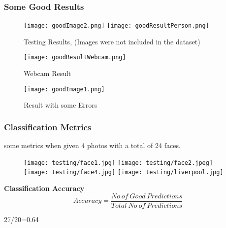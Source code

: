         \subsubsection{Some Good Results}

        \begin{figure}[H]
            \centering
            \texttt{[image: goodImage2.png]}
            \texttt{[image: goodResultPerson.png]}
            \caption{Testing Results, (Images were not included in the dataset)}
            \label{one}
        \end{figure}

        \begin{figure}[H]
            \centering
            \texttt{[image: goodResultWebcam.png]}
            \caption{Webcam Result}
            \label{two}
        \end{figure}

        \begin{figure}[H]
            \centering
            \texttt{[image: goodImage1.png]}
            \caption{Result with some Errors}
            \label{three}
        \end{figure}

        \pagebreak
        \subsubsection{Classification Metrics}
        some metrics when given 4 photos with a total of 24 faces.

        \begin{figure}[H]
            \centering
            \texttt{[image: testing/face1.jpg]}
            \texttt{[image: testing/face2.jpeg]}
            \texttt{[image: testing/face4.jpg]}
            \texttt{[image: testing/liverpool.jpg]}
        \end{figure}

        \large{\textbf{Classification Accuracy}}
        \begin{equation}
            Accuracy=
            \frac{No \ of\ Good\ Predictions}{Total\ No\ of\ Predictions}
        \end{equation}

        \begin{center}
            27/20=0.64
        \end{center}

